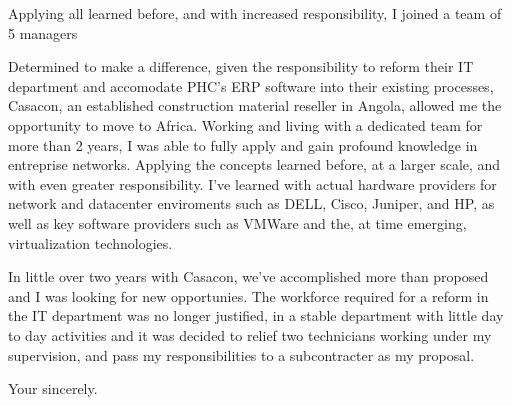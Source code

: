 \documentclass{letter}
\renewcommand*{\closing}[1]{\par\nobreak\vspace{\parskip}%
\vspace{2\parskip}%
#1\\[6\medskipamount]%
\fromsig
}
\begin{document}
\begin{letter}{}
Applying all learned before, and with increased responsibility, I joined a team of 5 managers

Determined to make a difference, given the responsibility to reform their IT department and
accomodate PHC's ERP software into their existing processes, Casacon, an established construction
material reseller in Angola, allowed me the opportunity to move to Africa. Working and living with
a dedicated team for more than 2 years, I was able to fully apply and gain profound knowledge in
entreprise networks. Applying the concepts learned before, at a larger scale, and
with even greater responsibility. I've learned  with actual hardware providers for network and datacenter
enviroments such as DELL, Cisco, Juniper, and HP, as well as key software providers such as VMWare
and the, at time emerging, virtualization technologies.

In little over two years with Casacon, we've accomplished more than proposed and I was looking for
new opportunies. The workforce required for a reform in the IT department was no longer justified,
in a stable department with little day to day activities and it was decided to relief two
technicians working under my supervision, and pass my responsibilities to a subcontracter as my
proposal.

\closing{Your sincerely.}
\end{letter}
\end{document}
